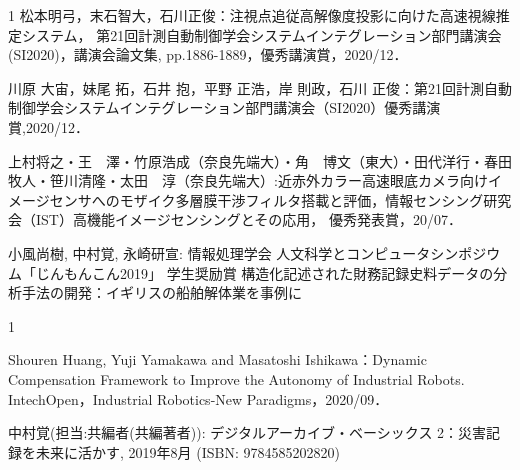 \begin{受賞}{1}
松本明弓，末石智大，石川正俊：注視点追従高解像度投影に向けた高速視線推定システム， 第21回計測自動制御学会システムインテグレーション部門講演会 (SI2020)，講演会論文集, pp.1886-1889，優秀講演賞，2020/12．

川原 大宙，妹尾 拓，石井 抱，平野 正浩，岸 則政，石川 正俊：第21回計測自動制御学会システムインテグレーション部門講演会（SI2020）優秀講演賞,2020/12．

上村将之・王　澤・竹原浩成（奈良先端大）・角　博文（東大）・田代洋行・春田牧人・笹川清隆・太田　淳（奈良先端大）:近赤外カラー高速眼底カメラ向けイメージセンサへのモザイク多層膜干渉フィルタ搭載と評価，情報センシング研究会（IST）高機能イメージセンシングとその応用， 優秀発表賞，20/07．

小風尚樹, 中村覚, 永崎研宣:
 情報処理学会 人文科学とコンピュータシンポジウム「じんもんこん2019」 学生奨励賞 構造化記述された財務記録史料データの分析手法の開発：イギリスの船舶解体業を事例に
\end{受賞}

\begin{著書}{1}

Shouren Huang, Yuji Yamakawa and Masatoshi Ishikawa：Dynamic Compensation Framework to Improve the Autonomy of Industrial Robots. IntechOpen，Industrial Robotics-New Paradigms，2020/09．

中村覚(担当:共編者(共編著者)):
 デジタルアーカイブ・ベーシックス 2：災害記録を未来に活かす, 2019年8月 (ISBN: 9784585202820)
\end{著書}

